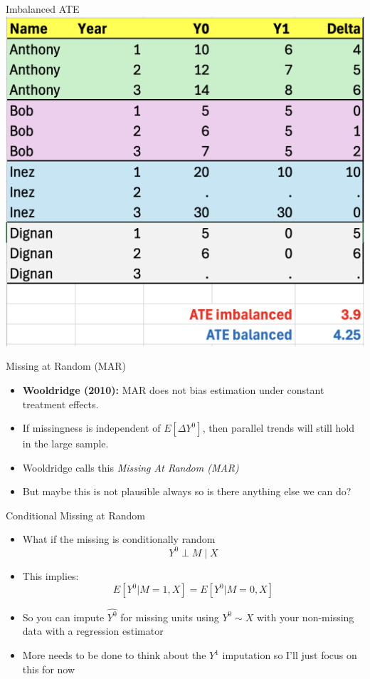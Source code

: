 \documentclass{beamer}
\begin{document}
\begin{frame}{Imbalanced ATE}
  \centering
  \includegraphics[height=0.85\textheight,keepaspectratio]{./lecture_includes/imbalanced.png}
\end{frame}

\begin{frame}{Missing at Random (MAR)}
  \begin{itemize}
    \item \textbf{Wooldridge (2010):} MAR does not bias estimation under constant treatment effects.
    \item If missingness is independent of $E[\Delta Y^0]$, then parallel trends will still hold in the large sample.
    \item Wooldridge calls this \emph{Missing At Random (MAR)}
    \item But maybe this is not plausible always so is there anything else we can do?
  \end{itemize}
\end{frame}


\begin{frame}{Conditional Missing at Random}
  \begin{itemize}
	\item What if the missing is conditionally random $$Y^0  \perp M \mid X$$
    \item This implies:
    $$E[Y^0|M=1,X] = E[Y^0|M=0,X]$$
	\item So you can impute $\widehat{Y^0}$ for missing units using $Y^0 \sim X$ with your non-missing data with a regression estimator
	\item More needs to be done to think about the $Y^1$ imputation so I'll just focus on this for now
  \end{itemize}
\end{frame}
\end{document}

